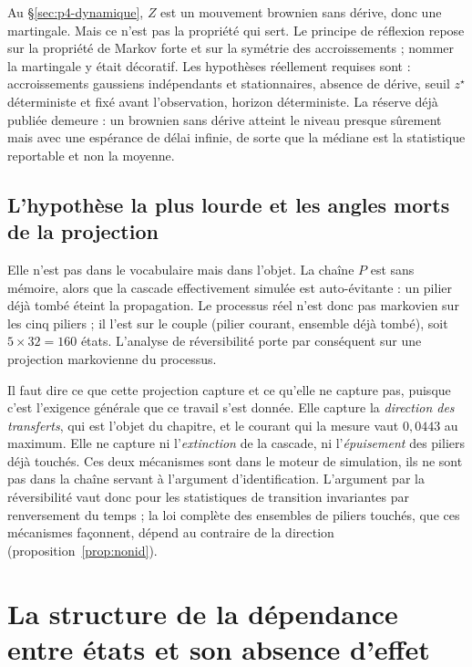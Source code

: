 Au \S\ref{sec:p4-dynamique}, $Z$ est un mouvement brownien sans dérive, donc une
martingale. Mais ce n'est pas la propriété qui sert. Le principe de réflexion repose sur
la propriété de Markov forte et sur la symétrie des accroissements ; nommer la
martingale y était décoratif. Les hypothèses réellement requises sont : accroissements gaussiens
indépendants et stationnaires, absence de dérive, seuil $z^\star$ déterministe et fixé avant
l'observation, horizon déterministe. La réserve déjà publiée demeure : un brownien sans dérive
atteint le niveau presque sûrement mais avec une espérance de délai infinie, de sorte que la
médiane est la statistique reportable et non la moyenne.

\subsection*{L'hypothèse la plus lourde et les angles morts de la projection}

Elle n'est pas dans le vocabulaire mais dans l'objet. La chaîne $P$ est sans mémoire,
alors que la cascade effectivement simulée est auto-évitante : un pilier déjà tombé
éteint la propagation. Le processus réel n'est donc pas markovien sur les cinq piliers ; il l'est
sur le couple (pilier courant, ensemble déjà tombé), soit $5 \times 32 = 160$ états. L'analyse de
réversibilité porte par conséquent sur une projection markovienne du processus.

Il faut dire ce que cette projection capture et ce qu'elle ne capture pas, puisque c'est l'exigence
générale que ce travail s'est donnée. Elle capture la \emph{direction des transferts}, qui est
l'objet du chapitre, et le courant qui la mesure vaut $0{,}0443$ au maximum. Elle ne capture ni
l'\emph{extinction} de la cascade, ni l'\emph{épuisement} des piliers déjà touchés. Ces deux
mécanismes sont dans le moteur de simulation, ils ne sont pas dans la chaîne servant à l'argument
d'identification. L'argument par la réversibilité vaut donc pour les statistiques de transition
invariantes par renversement du temps ; la loi complète des ensembles de piliers touchés, que ces
mécanismes façonnent, dépend au contraire de la direction (proposition~\ref{prop:nonid}).

\section{La structure de la dépendance entre états et son absence d'effet}
\label{sec:ann-dependance-etats}

